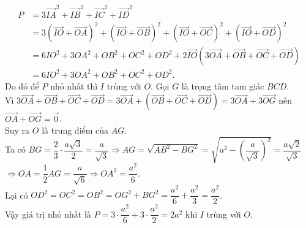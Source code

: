 \begin{ex}
{\begin{enumerate}[a)]
			      \begin{align*}
				      P & =3\vec{IA}^2+\vec{IB}^2+\vec{IC}^2+\vec{ID}^2                                                                                         \\
				        & =3\left(\vec{IO}+\vec{OA}\right)^2+\left(\vec{IO}+\vec{OB}\right)^2+\left(\vec{IO}+\vec{OC}\right)^2+\left(\vec{IO}+\vec{OD}\right)^2 \\
				        & =6IO^2+3OA^2+OB^2+OC^2+OD^2+2\vec{IO}\left(3\vec{OA}+\vec{OB}+\vec{OC}+\vec{OD}\right)                                                \\
				        & =6IO^2+3OA^2+OB^2+OC^2+OD^2.
			      \end{align*}
			      Do đó để $P$ nhỏ nhất thì $I$ trùng với $O$. Gọi $G$ là trọng tâm tam giác $BCD$.\\
			      Vì $3\vec{OA}+\vec{OB}+\vec{OC}+\vec{OD}=3\vec{OA}+\left(\vec{OB}+\vec{OC}+\vec{OD}\right) =3\vec{OA}+3\vec{OG}$ nên $\vec{OA}+\vec{OG}=\vec{0}$.\\
			      Suy ra $O$ là trung điểm của $AG$.\\
			      Ta có $BG=\dfrac{2}{3} \cdot \dfrac{a\sqrt{3}}{2}=\dfrac{a}{\sqrt{3}}\Rightarrow AG=\sqrt{AB^2-BG^2}=\sqrt{a^2-{{\left(\dfrac{a}{\sqrt{3}}\right)}^2}}=\dfrac{a\sqrt{2}}{\sqrt{3}}$\\
			      $\Rightarrow OA=\dfrac{1}{2}AG=\dfrac{a}{\sqrt{6}}\Rightarrow OA^2=\dfrac{a^2}{6}$.\\
			      Lại có $OD^2=OC^2=OB^2=OG^2+BG^2=\dfrac{a^2}{6}+\dfrac{a^2}{3}=\dfrac{a^2}{2}$.\\
			      Vậy giá trị nhỏ nhất là $P=3 \cdot \dfrac{a^2}{6}+3 \cdot \dfrac{a^2}{2}=2a^2$ khi $I$ trùng với $O$.
		\end{enumerate}
	}
\end{ex}
